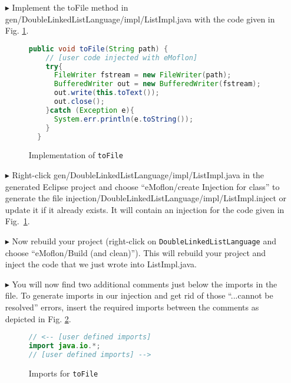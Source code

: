 \begin{enumerate}
  \item[$\blacktriangleright$] Implement the \textsf{toFile} method in \textsf{gen/Double\-Linked\-List\-Language/\-impl/\-ListImpl.java} with the code given in
  Fig. \ref{code:list_toFile_impl_code}.

\begin{figure}[htbp]
\centering
  \begin{lstlisting}[language=Java, keywordstyle={\bfseries\color{purple}}, backgroundcolor=\color{white}]
  public void toFile(String path) {
    // [user code injected with eMoflon]
    try{
      FileWriter fstream = new FileWriter(path);
      BufferedWriter out = new BufferedWriter(fstream);
      out.write(this.toText());
      out.close();
    }catch (Exception e){
      System.err.println(e.toString());
    }
  }
  \end{lstlisting}
\caption{Implementation of \texttt{toFile}}
\label{code:list_toFile_impl_code}
\end{figure}

  \item[$\blacktriangleright$] Right-click \textsf{gen/Double\-Linked\-List\-Language/\-impl/\-ListImpl.java} in the generated Eclipse project and choose
  ``eMoflon/create Injection for class'' to generate the file \textsf{injection/DoubleLinkedListLanguage/\-impl/List\-Impl\-.in\-ject} or update it if it
  already exists. It will contain an injection for the code given in Fig.~\ref{code:list_toFile_impl_code}.
  \item[$\blacktriangleright$] Now rebuild your project (right-click on \texttt{DoubleLinkedListLanguage} and choose ``eMoflon/Build (and clean)'').
  This will rebuild your project and inject the code that we just wrote into \textsf{ListImpl.java}.
  \item[$\blacktriangleright$] You will now find two additional comments just below the imports in the file.
  To generate imports in our injection and get rid of those ``...cannot be resolved'' errors, insert the required imports between the comments as depicted in
  Fig. \ref{code:imports_toFile}.
\begin{figure}[htbp]
\centering
  \begin{lstlisting}[language=Java, keywordstyle={\bfseries\color{purple}}, backgroundcolor=\color{white}]
// <-- [user defined imports]
import java.io.*;
// [user defined imports] -->
  \end{lstlisting}
\caption{Imports for \texttt{toFile}}
\label{code:imports_toFile}
\end{figure}


\end{enumerate}
